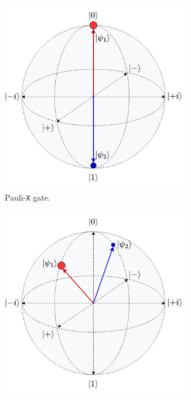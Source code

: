 \begin{figure}[ht!]
	\centering
	\begin{subfigure}[b]{0.28\textwidth}
		\centering
		\includegraphics[width=0.9\textwidth]{body/ch2/figs/x-gate}
		\caption{Pauli-\texttt{X} gate.}
		\label{fig:xgatebloch}
	\end{subfigure}
	\hfill
	\begin{subfigure}[b]{0.28\textwidth}
		\centering
		\includegraphics[width=0.9\textwidth]{body/ch2/figs/z-gate}

\end{subfigure}
\end{figure}
